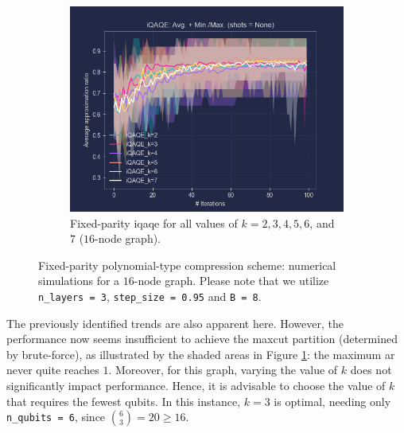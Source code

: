 \clearpage

\begin{figure}[ht!]
  \addtocounter{figure}{-1} %
  \centering
  \begin{subfigure}[b]{\textwidth}
      \addtocounter{subfigure}{2} %
      \centering
      \includegraphics[width=1\textwidth]{Figures/Chapter_5/Fixed-parity/All_k's(16-node).png}
      \caption{Fixed-parity \acrshort{iqaqe} for all values of $k = 2, 3, 4, 5, 6$, and $7$ ($16$-node graph).}
      \label{fig:All_k's(16_node)}
  \end{subfigure}
  \caption{Fixed-parity polynomial-type compression scheme: numerical simulations for a $16$-node graph. Please note that we utilize \texttt{n\_layers = 3}, \texttt{step\_size = 0.95} and \texttt{B = 8}.}
  \label{fig:Fixed-parity(16_node)}
\end{figure}

The previously identified trends are also apparent here. However, the performance now seems insufficient to achieve the \acrshort{maxcut} partition (determined by brute-force), as illustrated by the shaded areas in Figure \ref{fig:All_k's(16_node)}: the maximum \acrshort{ar} never quite reaches $1$. Moreover, for this graph, varying the value of $k$ does not significantly impact performance. Hence, it is advisable to choose the value of $k$ that requires the fewest qubits. In this instance, $k=3$ is optimal, needing only \texttt{n\_qubits = 6}, since $\binom{6}{3} = 20 \geq 16$.


